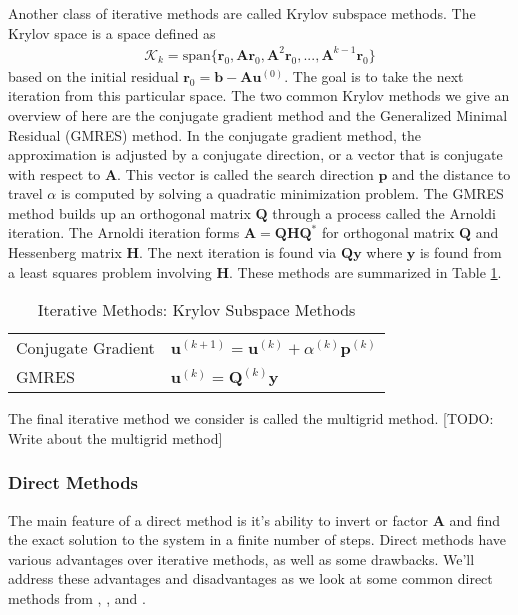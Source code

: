 Another class of iterative methods are called Krylov subspace methods. The Krylov space is a space defined as
\begin{align}
\mathcal{K}_k = \text{span} \{ \textbf{r}_0, \textbf{A} \textbf{r}_0, \textbf{A}^2 \textbf{r}_0, ..., \textbf{A}^{k-1} \textbf{r}_0 \}
\end{align}
based on the initial residual $\textbf{r}_0 = \textbf{b} - \textbf{A} \textbf{u}^{(0)}$. The goal is to take the next iteration from this particular space. The two common Krylov methods we give an overview of here are the conjugate gradient method and the Generalized Minimal Residual (GMRES) method. In the conjugate gradient method, the approximation is adjusted by a conjugate direction, or a vector that is conjugate with respect to $\textbf{A}$. This vector is called the search direction $\textbf{p}$ and the distance to travel $\alpha$ is computed by solving a quadratic minimization problem. The GMRES method builds up an orthogonal matrix $\textbf{Q}$ through a process called the Arnoldi iteration. The Arnoldi iteration forms $\textbf{A} = \textbf{Q} \textbf{H} \textbf{Q}^*$ for orthogonal matrix $\textbf{Q}$ and Hessenberg matrix $\textbf{H}$. The next iteration is found via $\textbf{Q} \textbf{y}$ where $\textbf{y}$ is found from a least squares problem involving $\textbf{H}$. These methods are summarized in Table \ref{tab:ksm}.

\begin{table}[h!]
    \centering
    \begin{tabular}{ | l | l |}
        \hline
        Conjugate Gradient & $\textbf{u}^{(k+1)} = \textbf{u}^{(k)} + \alpha^{(k)} \textbf{p}^{(k)}$ \\
        GMRES & $\textbf{u}^{(k)} = \textbf{Q}^{(k)} \textbf{y}$ \\
        \hline
    \end{tabular}
    \caption{Iterative Methods: Krylov Subspace Methods}
    \label{tab:ksm}
\end{table}

The final iterative method we consider is called the multigrid method. [TODO: Write about the multigrid method]

\subsubsection{Direct Methods}

The main feature of a direct method is it's ability to invert or factor $\textbf{A}$ and find the exact solution to the system in a finite number of steps. Direct methods have various advantages over iterative methods, as well as some drawbacks. We'll address these advantages and disadvantages as we look at some common direct methods from \citep{leveque2007finite}, \citep{martinsson2019fast}, and \citep{trefethen1997numerical}.

